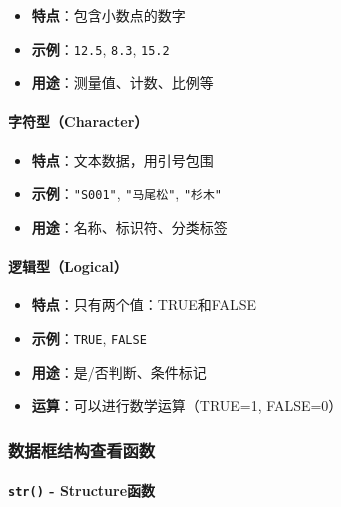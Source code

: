 \documentclass[
]{book}
\providecommand{\tightlist}{%
  \setlength{\itemsep}{0pt}\setlength{\parskip}{0pt}}
\begin{document}
\begin{itemize}
\tightlist
\item
  \textbf{特点}：包含小数点的数字
\item
  \textbf{示例}：\texttt{12.5}, \texttt{8.3}, \texttt{15.2}
\item
  \textbf{用途}：测量值、计数、比例等
\end{itemize}

\hypertarget{ux5b57ux7b26ux578bcharacter}{%
\paragraph{字符型（Character）}\label{ux5b57ux7b26ux578bcharacter}}

\begin{itemize}
\tightlist
\item
  \textbf{特点}：文本数据，用引号包围
\item
  \textbf{示例}：\texttt{"S001"}, \texttt{"马尾松"}, \texttt{"杉木"}
\item
  \textbf{用途}：名称、标识符、分类标签
\end{itemize}

\hypertarget{ux903bux8f91ux578blogical}{%
\paragraph{逻辑型（Logical）}\label{ux903bux8f91ux578blogical}}

\begin{itemize}
\tightlist
\item
  \textbf{特点}：只有两个值：TRUE和FALSE
\item
  \textbf{示例}：\texttt{TRUE}, \texttt{FALSE}
\item
  \textbf{用途}：是/否判断、条件标记
\item
  \textbf{运算}：可以进行数学运算（TRUE=1, FALSE=0）
\end{itemize}

\hypertarget{ux6570ux636eux6846ux7ed3ux6784ux67e5ux770bux51fdux6570}{%
\subsubsection{数据框结构查看函数}\label{ux6570ux636eux6846ux7ed3ux6784ux67e5ux770bux51fdux6570}}

\hypertarget{str---structureux51fdux6570}{%
\paragraph{\texorpdfstring{\texttt{str()} - Structure函数}{str() - Structure函数}}\label{str---structureux51fdux6570}}
\end{document}
